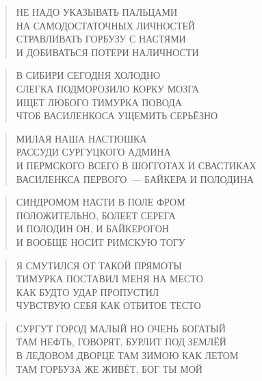 \poemtitle{***}
\begin{verse}
НЕ НАДО УКАЗЫВАТЬ ПАЛЬЦАМИ\\
НА САМОДОСТАТОЧНЫХ ЛИЧНОСТЕЙ\\
СТРАВЛИВАТЬ ГОРБУЗУ С НАСТЯМИ\\
И ДОБИВАТЬСЯ ПОТЕРИ НАЛИЧНОСТИ
\end{verse}

\poemtitle{***}
\begin{verse}
В СИБИРИ СЕГОДНЯ ХОЛОДНО\\
СЛЕГКА ПОДМОРОЗИЛО КОРКУ МОЗГА\\
ИЩЕТ ЛЮБОГО ТИМУРКА ПОВОДА\\
ЧТОБ ВАСИЛЕНКОСА УЩЕМИТЬ СЕРЬЁЗНО
\end{verse}

\poemtitle{***}
\begin{verse}
МИЛАЯ НАША НАСТЮШКА\\
РАССУДИ СУРГУЦКОГО АДМИНА\\
И ПЕРМСКОГО ВСЕГО В ШОГГОТАХ И СВАСТИКАХ\\
ВАСИЛЕНКСА ПЕРВОГО — БАЙКЕРА И ПОЛОДИНА
\end{verse}

\poemtitle{***}
\begin{verse}
СИНДРОМОМ НАСТИ В ПОЛЕ ФРОМ\\
ПОЛОЖИТЕЛЬНО, БОЛЕЕТ СЕРЕГА\\
И ПОЛОДИН ОН, И БАЙКЕРОГОН\\
И ВООБЩЕ НОСИТ РИМСКУЮ ТОГУ
\end{verse}

\poemtitle{***}
\begin{verse}
Я СМУТИЛСЯ ОТ ТАКОЙ ПРЯМОТЫ\\
ТИМУРКА ПОСТАВИЛ МЕНЯ НА МЕСТО\\
КАК БУДТО УДАР  ПРОПУСТИЛ\\
ЧУВСТВУЮ СЕБЯ КАК ОТБИТОЕ ТЕСТО
\end{verse}

\poemtitle{***}
\begin{verse}
СУРГУТ ГОРОД МАЛЫЙ НО ОЧЕНЬ БОГАТЫЙ\\
ТАМ НЕФТЬ, ГОВОРЯТ, БУРЛИТ ПОД ЗЕМЛЁЙ\\
В ЛЕДОВОМ ДВОРЦЕ ТАМ ЗИМОЮ КАК ЛЕТОМ\\
ТАМ ГОРБУЗА ЖЕ ЖИВЁТ, БОГ ТЫ МОЙ
\end{verse}

